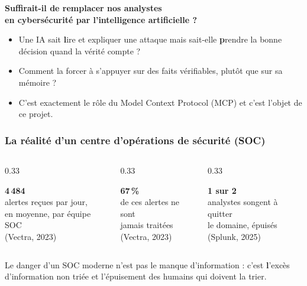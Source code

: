 \documentclass[aspectratio=169,11pt]{beamer}
\newcommand{\grandchiffre}[2]{%
  \begin{center}
    {\fontsize{26}{28}\selectfont\bfseries\color{colAccent}#1}\\[2pt]
    {\small\color{colGris}#2}
  \end{center}}
\begin{document}
\begin{frame}
  \begin{center}
    {\Large\bfseries\color{colTitre}
      Suffirait-il de remplacer nos analystes\\ en cybersécurité par l'intelligence artificielle ?}
  \end{center}
  \vspace{0.45cm}
  \begin{itemize}\setlength\itemsep{0.45em}
    \item<2-> Une IA sait \textbf lire et expliquer une attaque mais sait-elle
      \textbf prendre la bonne décision quand la vérité compte ?
    \item<3-> Comment la forcer à s'appuyer sur des faits vérifiables,
      plutôt que sur sa mémoire ?
    \item<4-> C'est exactement le rôle du Model Context Protocol (MCP) et c'est l'objet de ce projet.
  \end{itemize}
\end{frame}

\begin{frame}
  \frametitle{La réalité d'un centre d'opérations de sécurité (SOC)}
  \vspace{0.15cm}
  \begin{columns}[T]
    \begin{column}{0.33\textwidth}
      \grandchiffre{4\,484}{alertes reçues par jour,\\ en moyenne, par équipe SOC\\ {\scriptsize (Vectra, 2023)}}
    \end{column}
    \begin{column}{0.33\textwidth}
      \grandchiffre{67\,\%}{de ces alertes ne sont\\ jamais traitées\\ {\scriptsize (Vectra, 2023)}}
    \end{column}
    \begin{column}{0.33\textwidth}
      \grandchiffre{1 sur 2}{analystes songent à quitter\\ le domaine, épuisés\\ {\scriptsize (Splunk, 2025)}}
    \end{column}
  \end{columns}
  \vspace{0.5cm}
  \begin{block}{ }
    Le danger d'un SOC moderne n'est pas le manque d'information :
    c'est \textbf l'excès d'information non triée et l'épuisement des
    humains qui doivent la trier.
  \end{block}
\end{frame}
\end{document}
